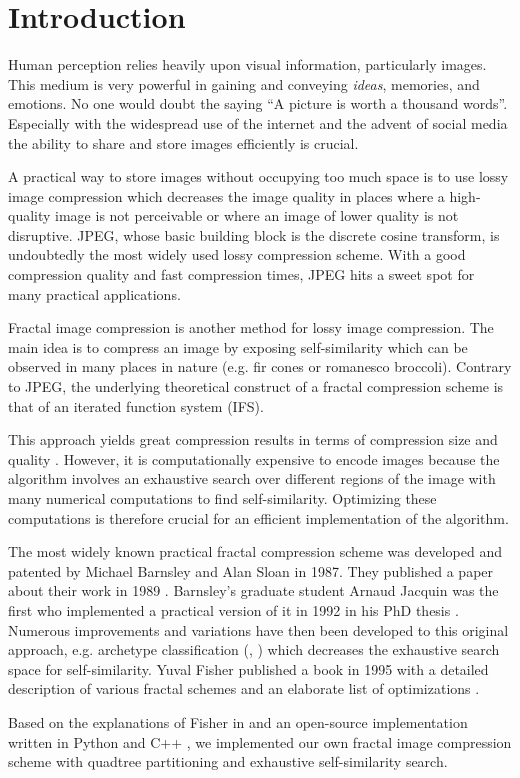 \section{Introduction}\label{sec:intro}

Human perception relies heavily upon visual information, particularly images.
This medium is very powerful in gaining and conveying \textit{ideas}, memories,
and emotions. No one would doubt the saying ``A picture is worth a thousand
words''. Especially with the widespread use of the internet and the advent of
social media the ability to share and store images efficiently is crucial.

A practical way to store images without occupying too much space is to use lossy
image compression which decreases the image quality in places where a
high-quality image is not perceivable or where an image of lower quality is not
disruptive. JPEG, whose basic building block is the discrete cosine transform,
is undoubtedly the most widely used lossy compression scheme. With a good
compression quality and fast compression times, JPEG hits a sweet spot for many
practical applications.

Fractal image compression is another method for lossy image compression. The
main idea is to compress an image by exposing self-similarity which can be
observed in many places in nature (e.g. fir cones or romanesco broccoli). 
Contrary to JPEG, the underlying theoretical construct of a fractal compression
scheme is that of an iterated function system (IFS). 

This approach yields great
compression results in terms of compression size and quality \cite{fisher2012}.
However, it is computationally expensive to encode images because the algorithm
involves an exhaustive search over different regions of the image with many
numerical computations to find self-similarity. Optimizing these computations is
therefore crucial for an efficient implementation of the algorithm.

 The most widely known practical fractal compression scheme
was developed and patented by Michael Barnsley and Alan Sloan in 1987. They
published a paper about their work in 1989 \cite{barnsley1989fractal}. Barnsley's
graduate student Arnaud Jacquin was the first who implemented a practical
version of it in 1992 in his PhD thesis \cite{jacquin1990fractal}. Numerous
improvements and variations have then been developed to this original approach,
e.g. archetype classification (\cite{jacobs1992image}, \cite{boss1991studies})
which decreases the exhaustive search space for self-similarity. Yuval Fisher
published a book in 1995 with a detailed description of various fractal schemes
and an elaborate list of optimizations \cite{fisher2012}.

 Based on the explanations of Fisher in \cite{fisher2012}
and an open-source implementation written in Python \cite{github-python} and C++
\cite{github-cpp}, we implemented our own fractal image compression scheme with
quadtree partitioning and exhaustive self-similarity search.

